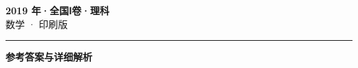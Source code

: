 \documentclass[zihao=5, a4paper]{ctexart}
\begin{document}
\begin{center}
  {\Large\bfseries 2019 年·全国Ⅰ卷·理科}\\[4pt]
  {\large 数学 · 印刷版}
\end{center}
\medskip
{}

\par\bigskip\hrule\bigskip
{}
\begin{center}{\large\bfseries 参考答案与详细解析}\end{center}
\smallskip

\end{document}

